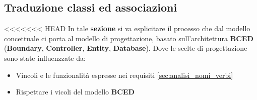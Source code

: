 \subsection{Traduzione classi ed associazioni}
\label{sec:prg_traduzione}

<<<<<<< HEAD
In tale \textbf{sezione} si va esplicitare il processo che dal modello concettuale ci porta al modello di progettazione, basato sull'architettura \textbf{BCED} (\textbf{Boundary}, \textbf{Controller}, \textbf{Entity}, \textbf{Database}).
Dove le scelte di progettazione sono state influenzzate da:
\begin{itemize}
\item Vincoli e le funzionalità espresse nei requisiti \ref{sec:analisi_nomi_verbi}
\item Rispettare i vicoli del modello \textbf{BCED}
\end{itemize}

